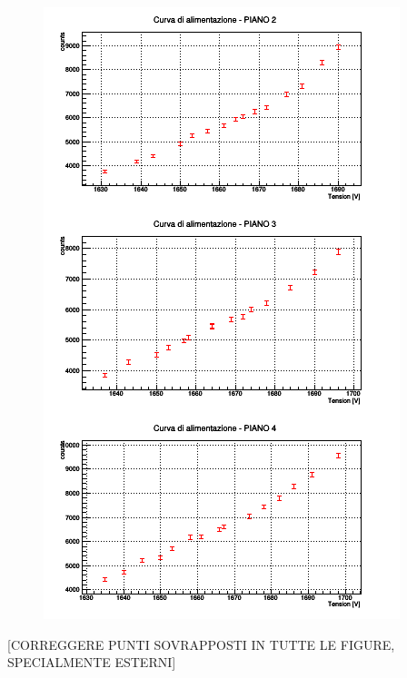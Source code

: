 \documentclass[11pt]{article}
\begin{document}
\begin{flushleft}
\begin{figure}
\includegraphics{"plateau_1"}
\end{figure}
[CORREGGERE PUNTI SOVRAPPOSTI IN TUTTE LE FIGURE, SPECIALMENTE ESTERNI]
\begin{figure}

\end{figure}
\end{flushleft}
\end{document}
